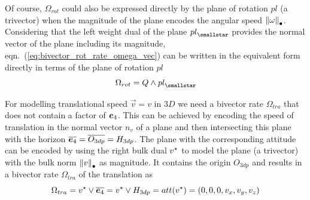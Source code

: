 Of course, $\Omega_{rot}$ could also be expressed directly by the plane of rotation $pl$
(a trivector) when the magnitude of the plane encodes the angular speed
${\left \lVert {\omega} \right \rVert}_\bullet$. Considering that the left weight dual of the plane
$\leftweightdual{pl}$ provides the normal vector of the plane including its magnitude,
eqn.~(\ref{eq:bivector_rot_rate_omega_vec}) can be written in the equivalent form directly
in terms of the plane of rotation $pl$
\begin{equation}
   \Omega_{rot} = Q \wedge \leftweightdual{pl}
   \label{eq:bivector_rot_rate_omega_pl_rot}
\end{equation}

For modelling translational speed $\vec{v} = v$ in $3D$ we need a bivector rate
$\Omega_{tra}$ that does not contain a factor of $\bm{e}_{4}$. This can be achieved by
encoding the speed of translation in the normal vector $n_v$ of a plane and then
intersecting this plane with the horizon $\overline{\bm{e}_{4}} = \overline{O_{3dp}} = H_{3dp}$. The
plane with the corresponding attitude can be encoded by using the right bulk dual
${v}^\star$ to model the plane (a trivector) with the bulk norm ${\left \lVert {v} \right \rVert}_\bullet$ as
magnitude. It contains the origin $O_{3dp}$ and results in a bivector rate $\Omega_{tra}$
of the translation as
\begin{equation}
   \Omega_{tra} = {v}^\star \vee \overline{\bm{e}_{4}} = {v}^\star \vee H_{3dp}
                = att({v}^\star)
                = (0, 0, 0, v_x, v_y, v_z)
   \label{eq:bivector_trans_rate_v_vec}
\end{equation}

